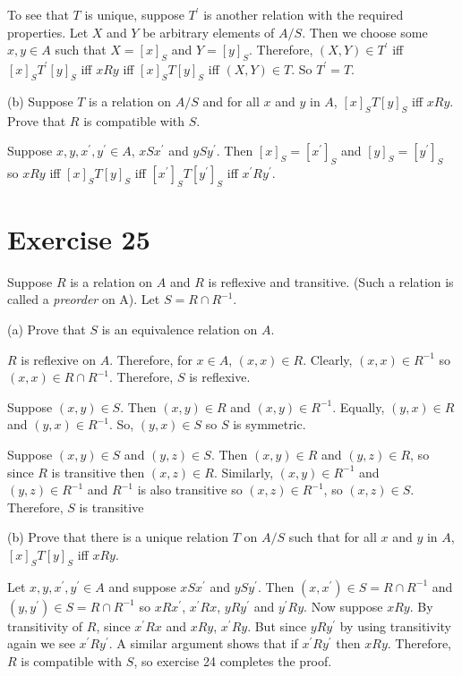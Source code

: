 \documentclass[11pt]{article}
\begin{document}
To see that $T$ is unique, suppose $T^\prime$ is another relation with 
the required properties. Let $X$ and $Y$ be arbitrary elements of $A/S$.
Then we choose some $x,y \in A$ such that $X = [x]_S$ and $Y = [y]_S$.
Therefore, $(X, Y) \in T^\prime$ iff $[x]_S T^\prime [y]_S$ iff $xRy$ iff 
$[x]_S T [y]_S$ iff $(X, Y) \in T$. So $T^\prime = T$.

\noindent (b) Suppose $T$ is a relation on $A/S$ and for all $x$ and $y$ in $A$,
$[x]_S T [y]_S$ iff $xRy$. Prove that $R$ is compatible with $S$.

Suppose $x,y,x^\prime,y^\prime \in A$, $xSx^\prime$ and $ySy^\prime$. Then 
$[x]_S = [x^\prime]_S$ and $[y]_S = [y^\prime]_S$ so $xRy$ iff $[x]_S T [y]_S$
iff $[x^\prime]_S T [y^\prime]_S$ iff $x^\prime R y^\prime$.

\section*{Exercise 25}

Suppose $R$ is a relation on $A$ and $R$ is reflexive and transitive. (Such a 
relation is called a \textit{preorder} on A). Let $S = R \cap R^{-1}$.

\noindent (a) Prove that $S$ is an equivalence relation on $A$.

$R$ is reflexive on $A$. Therefore, for $x \in A$, $(x,x) \in R$. Clearly, 
$(x,x) \in R^{-1}$ so $(x,x) \in R \cap R^{-1}$. Therefore, $S$ is reflexive.

Suppose $(x,y) \in S$. Then $(x,y) \in R$ and $(x,y) \in R^{-1}$. Equally,
$(y,x) \in R$ and $(y,x) \in R^{-1}$. So, $(y,x) \in S$ so $S$ is symmetric.

Suppose $(x,y) \in S$ and $(y,z) \in S$. Then $(x,y) \in R$ and $(y,z) \in R$,
so since $R$ is transitive then $(x,z) \in R$. Similarly, $(x,y) \in R^{-1}$
and $(y,z) \in R^{-1}$ and $R^{-1}$ is also transitive so $(x,z) \in R^{-1}$,
so $(x,z) \in S$. Therefore, $S$ is transitive

\noindent (b) Prove that there is a unique relation $T$ on $A/S$ such that for 
all $x$ and $y$ in $A$, $[x]_S T [y]_S$ iff $xRy$.

Let $x,y,x^\prime,y^\prime \in A$ and suppose $xSx^\prime$ and $ySy^\prime$.
Then $(x,x^\prime) \in S = R \cap R^{-1}$ and $(y,y^\prime) \in S = R \cap R^{-1}$
so $xRx^\prime$, $x^\prime Rx$, $yRy^\prime$ and $y^\prime Ry$. Now suppose 
$xRy$. By transitivity of $R$, since $x^\prime Rx$ and $xRy$, $x^\prime Ry$.
But since $yRy^\prime$ by using transitivity again we see $x^\prime R y^\prime$.
A similar argument shows that if $x^\prime R y^\prime$ then $xRy$. Therefore,
$R$ is compatible with $S$, so exercise 24 completes the proof.
\end{document}
